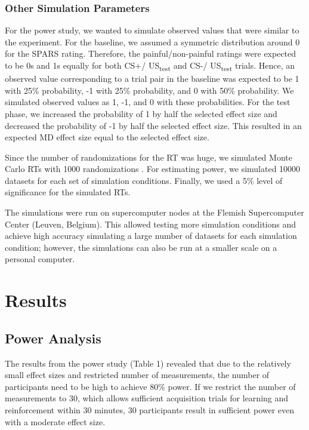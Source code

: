 \documentclass[empirical,issue, twocolumn,authordate]{jote-new-article}
\begin{document}
\subsubsection{Other Simulation Parameters}

For the power study, we wanted to simulate observed values that were similar to the experiment. For the baseline, we assumed a symmetric distribution around 0 for the SPARS rating. Therefore, the painful/non-painful ratings were expected to be 0s and 1s equally for both CS+/ US\textsubscript{test} and CS-/ US\textsubscript{test} trials. Hence, an observed value corresponding to a trial pair in the baseline was expected to be 1 with 25\% probability, -1 with 25\% probability, and 0 with 50\% probability. We simulated observed values as 1, -1, and 0 with these probabilities. For the test phase, we increased the probability of 1 by half the selected effect size and decreased the probability of -1 by half the selected effect size. This resulted in an expected MD effect size equal to the selected effect size. 

Since the number of randomizations for the RT was huge, we simulated Monte Carlo RTs with 1000 randomizations \parencite{Edgington1969}. For estimating power, we simulated 10000 datasets for each set of simulation conditions. Finally, we used a 5\% level of significance for the simulated RTs.



The simulations were run on supercomputer nodes at the Flemish Supercomputer Center (Leuven, Belgium). This allowed testing more simulation conditions and achieve high accuracy simulating a large number of datasets for each simulation condition; however, the simulations can also be run at a smaller scale on a personal computer. 

\section{Results}

\subsection{Power Analysis}

The results from the power study (Table 1) revealed that due to the relatively small effect sizes and restricted number of measurements, the number of participants need to be high to achieve 80\% power. If we restrict the number of measurements to 30, which allows sufficient acquisition trials for learning and reinforcement within 30 minutes, 30 participants result in sufficient power even with a moderate effect size. 
\end{document}
